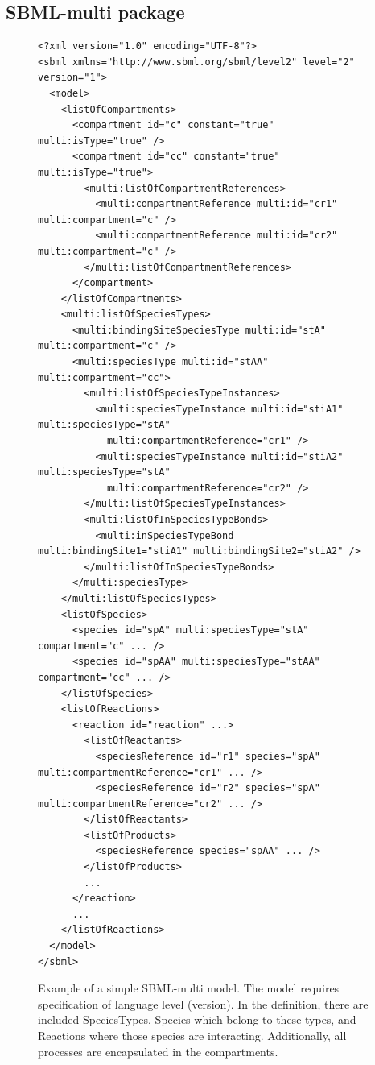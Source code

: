 \documentclass[12pt, twoside]{fithesis2} %
\begin{document}
\subsection{SBML-multi package}

\begin{figure}[!h]
\lstset{language=XML}
\begin{lstlisting}[basicstyle=\scriptsize, frame=single]
<?xml version="1.0" encoding="UTF-8"?>
<sbml xmlns="http://www.sbml.org/sbml/level2" level="2" version="1">
  <model>
    <listOfCompartments>
      <compartment id="c" constant="true" multi:isType="true" />
      <compartment id="cc" constant="true" multi:isType="true">
        <multi:listOfCompartmentReferences>
          <multi:compartmentReference multi:id="cr1" multi:compartment="c" />
          <multi:compartmentReference multi:id="cr2" multi:compartment="c" />
        </multi:listOfCompartmentReferences>
      </compartment>
    </listOfCompartments>
    <multi:listOfSpeciesTypes>
      <multi:bindingSiteSpeciesType multi:id="stA" multi:compartment="c" />
      <multi:speciesType multi:id="stAA" multi:compartment="cc">
        <multi:listOfSpeciesTypeInstances>
          <multi:speciesTypeInstance multi:id="stiA1" multi:speciesType="stA"
            multi:compartmentReference="cr1" />
          <multi:speciesTypeInstance multi:id="stiA2" multi:speciesType="stA"
            multi:compartmentReference="cr2" />
        </multi:listOfSpeciesTypeInstances>
        <multi:listOfInSpeciesTypeBonds>
          <multi:inSpeciesTypeBond multi:bindingSite1="stiA1" multi:bindingSite2="stiA2" />
        </multi:listOfInSpeciesTypeBonds>
      </multi:speciesType>
    </multi:listOfSpeciesTypes>
    <listOfSpecies>
      <species id="spA" multi:speciesType="stA" compartment="c" ... />
      <species id="spAA" multi:speciesType="stAA" compartment="cc" ... />
    </listOfSpecies>
    <listOfReactions>
      <reaction id="reaction" ...>
        <listOfReactants>
          <speciesReference id="r1" species="spA" multi:compartmentReference="cr1" ... />
          <speciesReference id="r2" species="spA" multi:compartmentReference="cr2" ... />
        </listOfReactants>
        <listOfProducts>
          <speciesReference species="spAA" ... />
        </listOfProducts>
        ...
      </reaction>
      ...
    </listOfReactions>
  </model>
</sbml>
\end{lstlisting}
\caption{Example of a simple SBML-multi model. The model requires specification of language level (version). In the definition, there are included SpeciesTypes, Species which belong to these types, and Reactions where those species are interacting. Additionally, all processes are encapsulated in the compartments.}\label{SBML_example}
\end{figure}
\end{document}
